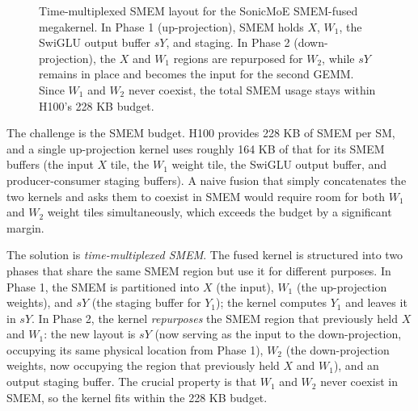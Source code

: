 \documentclass[10pt]{article}
\begin{document}
\begin{figure}[t]
\caption{Time-multiplexed SMEM layout for the SonicMoE SMEM-fused megakernel. In Phase 1 (up-projection), SMEM holds $X$, $W_1$, the SwiGLU output buffer $sY$, and staging. In Phase 2 (down-projection), the $X$ and $W_1$ regions are repurposed for $W_2$, while $sY$ remains in place and becomes the input for the second GEMM. Since $W_1$ and $W_2$ never coexist, the total SMEM usage stays within H100's 228 KB budget.}
\label{fig:smem-layout}
\end{figure}

The challenge is the SMEM budget. H100 provides 228 KB of SMEM per SM, and a single up-projection kernel uses roughly 164 KB of that for its SMEM buffers (the input $X$ tile, the $W_1$ weight tile, the SwiGLU output buffer, and producer-consumer staging buffers). A naive fusion that simply concatenates the two kernels and asks them to coexist in SMEM would require room for both $W_1$ and $W_2$ weight tiles simultaneously, which exceeds the budget by a significant margin.

The solution is \emph{time-multiplexed SMEM}. The fused kernel is structured into two phases that share the same SMEM region but use it for different purposes. In Phase 1, the SMEM is partitioned into $X$ (the input), $W_1$ (the up-projection weights), and $sY$ (the staging buffer for $Y_1$); the kernel computes $Y_1$ and leaves it in $sY$. In Phase 2, the kernel \emph{repurposes} the SMEM region that previously held $X$ and $W_1$: the new layout is $sY$ (now serving as the input to the down-projection, occupying its same physical location from Phase 1), $W_2$ (the down-projection weights, now occupying the region that previously held $X$ and $W_1$), and an output staging buffer. The crucial property is that $W_1$ and $W_2$ never coexist in SMEM, so the kernel fits within the 228 KB budget.
\end{document}
